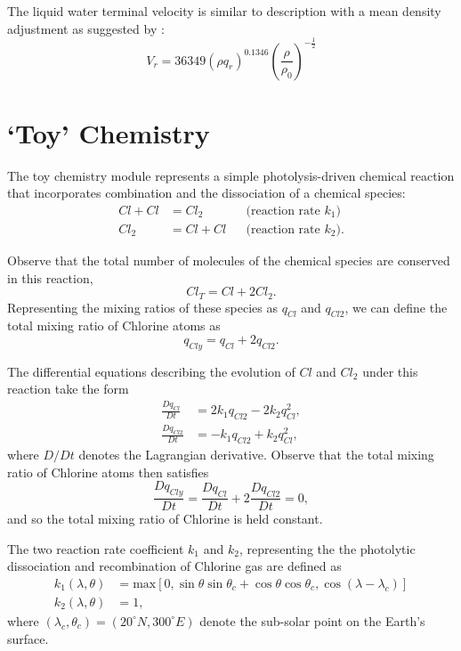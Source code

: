 \documentclass[times,doublespace]{fldauth}
\begin{document}
{\begin{appendix}
The liquid water terminal velocity is similar to \cite{soong1973comparison} description with a mean density adjustment as suggested by \cite{kessler1969distribution}:
\begin{equation}
V_r = 36349(\rho q_r)^{0.1346}\left(\frac{\rho}{\rho_0}\right)^{-\frac{1}{2}}
\end{equation}


\section{`Toy' Chemistry} \label{sec:ToyChemistry}

The toy chemistry module represents a simple photolysis-driven chemical reaction that incorporates combination and the dissociation of a chemical species:
\begin{align}
Cl + Cl &= Cl_2 && \mbox{(reaction rate $k_1$)}\\
Cl_2&=Cl+Cl && \mbox{(reaction rate $k_2$)}.
\end{align}

Observe that the total number of molecules of the chemical species are conserved in this reaction,
\begin{equation}
Cl_T=Cl+2 Cl_2.
\end{equation}  Representing the mixing ratios of these species as $q_{Cl}$ and $q_{Cl2}$, we can define the total mixing ratio of Chlorine atoms as
\begin{equation}
q_{Cly} = q_{Cl} + 2 q_{Cl2}.
\end{equation}

The differential equations describing the evolution of $Cl$ and $Cl_2$ under this reaction take the form
\begin{align}
\frac{Dq_{Cl}}{Dt} &= 2k_1 q_{Cl2} -2k_2 q_{Cl}^2, \\
\frac{Dq_{Cl2}}{Dt} &= -k_1 q_{Cl2} + k_2 q_{Cl}^2,
\end{align} where $D/Dt$ denotes the Lagrangian derivative.  Observe that the total mixing ratio of Chlorine atoms then satisfies
\begin{equation}
\frac{Dq_{Cly}}{Dt} = \frac{Dq_{Cl}}{Dt} + 2 \frac{Dq_{Cl2}}{Dt} = 0,
\end{equation} and so the total mixing ratio of Chlorine is held constant.

The two reaction rate coefficient  $k_1$ and $k_2$, representing the the photolytic dissociation and recombination of Chlorine gas are defined as
\begin{align}
k_1(\lambda,\theta)&= \mbox{max} \left[ 0,\sin\theta\sin\theta_c+\cos\theta\cos\theta_c, \label{app:term_k1}
\cos(\lambda-\lambda_c) \right] \\
k_2(\lambda,\theta)&=1,\label{app:term_k2}
\end{align} where $(\lambda_c, \theta_c)=(20^\circ N, 300^\circ E)$ denote the sub-solar point on the Earth's surface.


\end{appendix}}
\end{document}
